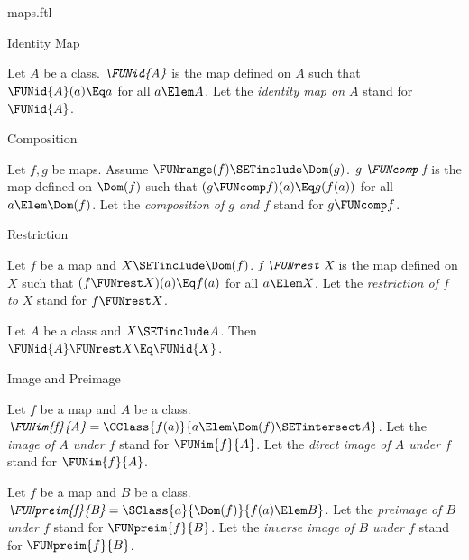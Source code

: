 \documentclass{stex}
\begin{document}
\begin{smodule}{maps.ftl}
\begin{sfragment}{Identity Map}
  \begin{definition}[forthel,for={identity map}]
    Let $A$ be a class.
    $\emph{\FUNid{A}}$ is the map defined on $A$ such that $\FUNid{A}(a) \Eq a$ for all $a \Elem A$.
    Let the \emph{identity map on $A$} stand for $\FUNid{A}$.
  \end{definition}
\end{sfragment}

\begin{sfragment}{Composition}
  \begin{definition}[forthel,for=composition]
    Let $f, g$ be maps.
    Assume $\FUNrange(f) \SETinclude \Dom(g)$.
    $\emph{g \FUNcomp f}$ is the map defined on $\Dom(f)$ such that $(g \FUNcomp f)(a) \Eq g(f(a))$ for all $a \Elem \Dom(f)$.
    Let the \emph{composition of $g$ and $f$} stand for $g \FUNcomp f$.
  \end{definition}
\end{sfragment}

\begin{sfragment}{Restriction}
  \begin{definition}[forthel,for=restriction]
    Let $f$ be a map and $X \SETinclude \Dom(f)$.
    $\emph{f \FUNrest X}$ is the map defined on $X$ such that $(f \FUNrest X)(a) \Eq f(a)$ for all $a \Elem X$.
    Let the \emph{restriction of $f$ to $X$} stand for $f \FUNrest X$.
  \end{definition}

  \begin{proposition}[forthel]
    Let $A$ be a class and $X \SETinclude A$.
    Then $\FUNid{A} \FUNrest X \Eq \FUNid{X}$.
  \end{proposition}
\end{sfragment}

\begin{sfragment}{Image and Preimage}
  \begin{definition}[forthel,for={FUNim,image,direct image}]
    Let $f$ be a map and $A$ be a class.
    $\emph{\FUNim{f}{A}} = \CClass{f(a)}{a \Elem \Dom(f) \SETintersect A}$.
    Let the \emph{image of $A$ under $f$} stand for $\FUNim{f}{A}$.
    Let the \emph{direct image of $A$ under $f$} stand for $\FUNim{f}{A}$.
  \end{definition}

  \begin{definition}[forthel,for={preimage,inverse image}]
    Let $f$ be a map and $B$ be a class.
    $\emph{\FUNpreim{f}{B}} = \SClass{a}{\Dom(f)}{f(a) \Elem B}$.
    Let the \emph{preimage of $B$ under $f$} stand for $\FUNpreim{f}{B}$.
    Let the \emph{inverse image of $B$ under $f$} stand for $\FUNpreim{f}{B}$.
  \end{definition}
\end{sfragment}


\end{smodule}
\end{document}
